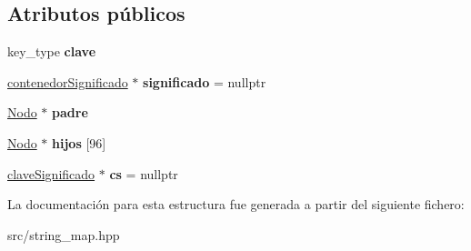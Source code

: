 \subsection*{Atributos públicos}
\begin{DoxyCompactItemize}
\item 
\hypertarget{structstring__map_1_1Nodo_a45d984307ea5eba917ac3705068c0b9f}{key\+\_\+type {\bfseries clave}}\label{structstring__map_1_1Nodo_a45d984307ea5eba917ac3705068c0b9f}

\item 
\hypertarget{structstring__map_1_1Nodo_a1faa6ae87c4d6ea85e5be6b782f1cbde}{\hyperlink{classstring__map_1_1contenedorSignificado}{contenedor\+Significado} $\ast$ {\bfseries significado} = nullptr}\label{structstring__map_1_1Nodo_a1faa6ae87c4d6ea85e5be6b782f1cbde}

\item 
\hypertarget{structstring__map_1_1Nodo_a0253586cd93ddd52ad4c1951bc7975d0}{\hyperlink{structstring__map_1_1Nodo}{Nodo} $\ast$ {\bfseries padre}}\label{structstring__map_1_1Nodo_a0253586cd93ddd52ad4c1951bc7975d0}

\item 
\hypertarget{structstring__map_1_1Nodo_a4ce44d768300be000acded0893029804}{\hyperlink{structstring__map_1_1Nodo}{Nodo} $\ast$ {\bfseries hijos} \mbox{[}96\mbox{]}}\label{structstring__map_1_1Nodo_a4ce44d768300be000acded0893029804}

\item 
\hypertarget{structstring__map_1_1Nodo_a48f75db8a6380cfd5be89491222d251e}{\hyperlink{classstring__map_1_1claveSignificado}{clave\+Significado} $\ast$ {\bfseries cs} = nullptr}\label{structstring__map_1_1Nodo_a48f75db8a6380cfd5be89491222d251e}

\end{DoxyCompactItemize}


La documentación para esta estructura fue generada a partir del siguiente fichero\+:\begin{DoxyCompactItemize}
\item 
src/string\+\_\+map.\+hpp\end{DoxyCompactItemize}
